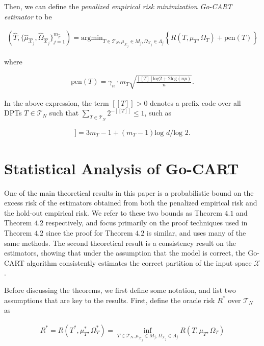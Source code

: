 \documentclass[12pt]{article}
\begin{document}
Then, we can define the \emph{penalized empirical risk minimization
  Go-CART estimator} to be

\begin{align}
    \left( \hat{T}, \{ \hat{\mu}_{\hat{\mathcal{X}}_j}, \hat{\Omega}_{\hat{\mathcal{X}}_j} \}_{j=1}^{m_{\hat{T}}} \right) 
    = \text{argmin}_{T \in \mathcal{T}_N, \mu_{\mathcal{X}_j} \in M_j, \Omega_{\mathcal{X}_j} \in \Lambda_j} 
    \left\{ \hat{R}(T,\mu_T,\Omega_T) + \text{pen}(T) \right\}
\end{align}

where

\begin{align}
    \text{pen}(T) = \gamma_n \cdot m_T \sqrt{\frac{[[T]]\text{log}2 + 2\text{log}(np)}{n}}.
\end{align}

In the above expression, the term $[[T]] > 0$ denotes a prefix code
over all DPTs $T \in \mathcal{T}_N$ such that $\sum_{T\in
  \mathcal{T}_N} 2^{-[[T]]} \leq 1$, such as

\begin{align}
    [[T]] = 3 m_T - 1 + (m_T - 1)\text{log }d / \text{log }2.
\end{align}

\section{Statistical Analysis of Go-CART}

One of the main theoretical results in this paper is a probabilistic
bound on the excess risk of the estimators obtained from both the
penalized empirical risk and the hold-out empirical risk. We refer to
these two bounds as Theorem $4.1$ and Theorem $4.2$ respectively, and
focus primarily on the proof techniques used in Theorem $4.2$ since
the proof for Theorem $4.2$ is similar, and uses many of the same
methods. The second theoretical result is a consistency result on the
estimators, showing that under the assumption that the model is
correct, the Go-CART algorithm consistently estimates the correct
partition of the input space $\mathcal{X}$.

Before discussing the theorems, we first define some notation, and
list two assumptions that are key to the results. First, define the
oracle risk $R^*$ over $\mathcal{T}_N$ as

\begin{align}
  R^* = R(T^*, \mu_T^*, \Omega_T^*)
  = \inf_{T \in \mathcal{T}_N, \mu_{\mathcal{X}_j} \in M_j, \Omega_{\mathcal{X}_j} \in \Lambda_j}
  R(T, \mu_T, \Omega_T)
\end{align}
\end{document}
